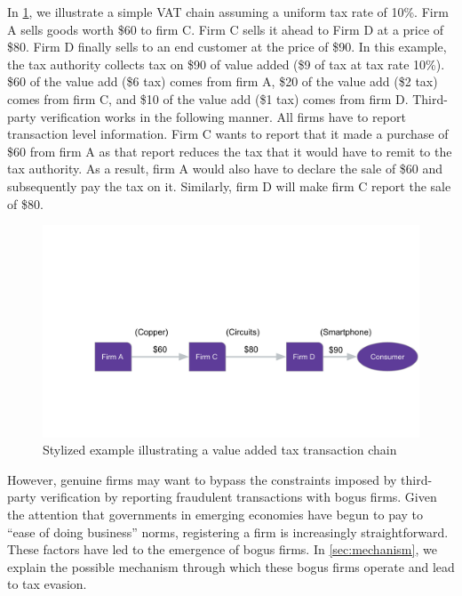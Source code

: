 In \cref{fig:bogus-mechanism}, we illustrate a simple VAT chain assuming a uniform tax rate of 10\%. Firm A sells goods worth \$60 to firm C. Firm C sells it ahead to Firm D at a price of \$80. Firm D finally sells to an end customer at the price of \$90. In this example, the tax authority collects tax on \$90 of value added (\$9 of tax at tax rate 10\%). \$60 of the value add (\$6 tax) comes from firm A, \$20 of the value add (\$2 tax) comes from firm C, and \$10 of the value add (\$1 tax) comes from firm D. Third-party verification works in the following manner. All firms have to report transaction level information. Firm C wants to report that it made a purchase of \$60 from firm A as that report reduces the tax that it would have to remit to the tax authority. As a result, firm A would also have to declare the sale of \$60 and subsequently pay the tax on it. Similarly, firm D will make firm C report the sale of \$80.

\begin{figure}
  \includegraphics[width=1\textwidth, page=2]{figures/StylizedExample_New2.pdf}
  \caption{Stylized example illustrating a value added tax transaction chain}
  \label{fig:bogus-mechanism}
\end{figure}
However, genuine firms may want to bypass the constraints imposed by third-party verification by reporting fraudulent transactions with bogus firms. Given the attention that governments in emerging economies have begun to pay to ``ease of doing business'' norms, registering a firm is increasingly straightforward. These factors have led to the emergence of bogus firms. In \cref{sec:mechanism}, we explain the possible mechanism through which these bogus firms operate and lead to tax evasion.

